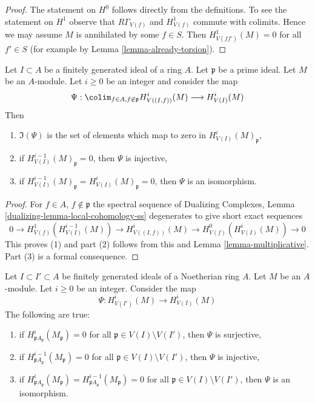 \begin{proof}
The statement on $H^0$ follows directly from the definitions.
To see the statement on $H^1$ observe that $R\Gamma_{V(f)}$
and $H^1_{V(f)}$ commute with colimits. Hence we may assume
$M$ is annihilated by some $f \in S$. Then
$H^1_{V(ff')}(M) = 0$ for all $f' \in S$ (for example by
Lemma \ref{lemma-already-torsion}).
\end{proof}

\begin{lemma}
\label{lemma-elements-come-from-bigger}
Let $I \subset A$ be a finitely generated ideal of a ring $A$.
Let $\mathfrak p$ be a prime ideal. Let $M$ be an $A$-module.
Let $i \geq 0$ be an integer and consider the map
$$
\Psi :
\colim_{f \in A, f \not \in \mathfrak p} H^i_{V((I, f))}(M)
\longrightarrow
H^i_{V(I)}(M)
$$
Then
\begin{enumerate}
\item $\Im(\Psi)$ is the set of elements which map to zero in
$H^i_{V(I)}(M)_\mathfrak p$,
\item if $H^{i - 1}_{V(I)}(M)_\mathfrak p = 0$, then $\Psi$ is injective,
\item if $H^{i - 1}_{V(I)}(M)_\mathfrak p = H^i_{V(I)}(M)_\mathfrak p = 0$,
then $\Psi$ is an isomorphism.
\end{enumerate}
\end{lemma}

\begin{proof}
For $f \in A$, $f \not \in \mathfrak p$ the spectral sequence of
Dualizing Complexes, Lemma \ref{dualizing-lemma-local-cohomology-ss}
degenerates to give short exact sequences
$$
0 \to H^1_{V(f)}(H^{i - 1}_{V(I)}(M)) \to
H^i_{V((I, f))}(M) \to H^0_{V(f)}(H^i_{V(I)}(M)) \to 0
$$
This proves (1) and part (2) follows from this and
Lemma \ref{lemma-multiplicative}.
Part (3) is a formal consequence.
\end{proof}

\begin{lemma}
\label{lemma-isomorphism}
Let $I \subset I' \subset A$ be finitely generated ideals of a
Noetherian ring $A$. Let $M$ be an $A$-module. Let $i \geq 0$ be an integer.
Consider the map
$$
\Psi : H^i_{V(I')}(M) \to H^i_{V(I)}(M)
$$
The following are true:
\begin{enumerate}
\item if $H^i_{\mathfrak pA_\mathfrak p}(M_\mathfrak p) = 0$
for all $\mathfrak p \in V(I) \setminus V(I')$, then
$\Psi$ is surjective,
\item if $H^{i - 1}_{\mathfrak pA_\mathfrak p}(M_\mathfrak p) = 0$
for all $\mathfrak p \in V(I) \setminus V(I')$, then
$\Psi$ is injective,
\item if $H^i_{\mathfrak pA_\mathfrak p}(M_\mathfrak p) =
H^{i - 1}_{\mathfrak pA_\mathfrak p}(M_\mathfrak p) = 0$
for all $\mathfrak p \in V(I) \setminus V(I')$, then
$\Psi$ is an isomorphism.
\end{enumerate}
\end{lemma}

